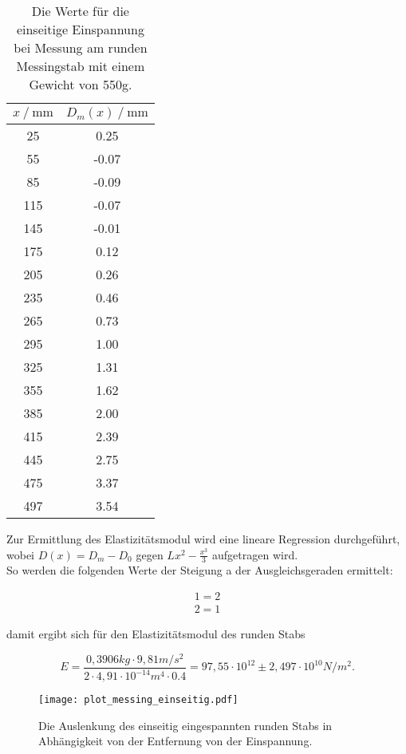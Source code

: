 \begin{table}[H]
  \centering
  \caption{Die Werte für die einseitige Einspannung bei Messung am runden Messingstab mit einem Gewicht von 550g.}
  \begin{tabular}{cc}
    \toprule
    {$x \mathbin{/} \unit{\milli\metre}$} &
    {$D_m(x) \mathbin{/} \unit{\milli\metre}$} \\
    \midrule
     25 &  0.25 \\
     55 & -0.07 \\
     85 & -0.09 \\
    115 & -0.07 \\
    145 & -0.01 \\
    175 & 0.12 \\
    205 & 0.26 \\ 
    235 & 0.46 \\
    265 & 0.73 \\
    295 & 1.00 \\
    325 & 1.31 \\
    355 & 1.62 \\
    385 & 2.00 \\
    415 & 2.39 \\
    445 & 2.75 \\
    475 & 3.37 \\
    497 & 3.54 \\
    
    \bottomrule
  \end{tabular}
  \label{tab:Tabelle2}
\end{table}

Zur Ermittlung des Elastizitätsmodul wird eine lineare Regression durchgeführt, wobei $D(x) = D_m - D_0$ gegen 
$Lx^2 - \frac{x^3}{3}$ aufgetragen wird.\\
So werden die folgenden Werte der Steigung a der Ausgleichsgeraden ermittelt:

\begin{align*}
  1 = 2 \\
  2 = 1
\end{align*}

damit ergibt sich für den Elastizitätsmodul des runden Stabs

\begin{equation*}
  E = \frac{0,3906kg \cdot 9,81m/s^2}{2 \cdot 4,91\cdot 10^{-14} m^4 \cdot 0.4} = 97,55 \cdot 10^{12} \pm 2,497 \cdot 10^{10} N/m^2.
\end{equation*}


\begin{figure}
  \centering
  \texttt{[image: plot\_messing\_einseitig.pdf]}
  \caption{Die Auslenkung des einseitig eingespannten runden Stabs in Abhängigkeit 
  von der Entfernung von der Einspannung.}
  \label{fig:plot_messing_einseitig}
\end{figure}

